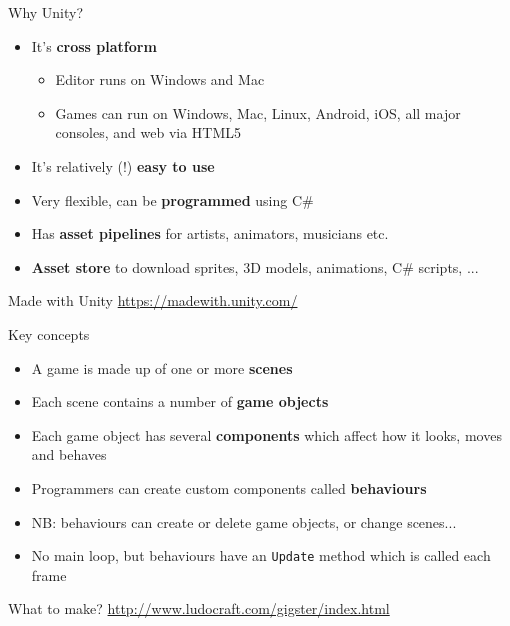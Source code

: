 \begin{frame}{Why Unity?}
	\begin{itemize}
		\pause\item It's \textbf{cross platform}
			\begin{itemize}
				\pause\item Editor runs on Windows and Mac
				\pause\item Games can run on Windows, Mac, Linux, Android, iOS, all major consoles, and web via HTML5
			\end{itemize}
		\pause\item It's relatively (!) \textbf{easy to use}
		\pause\item Very flexible, can be \textbf{programmed} using C\#
		\pause\item Has \textbf{asset pipelines} for artists, animators, musicians etc.
		\pause\item \textbf{Asset store} to download sprites, 3D models, animations, C\# scripts, ...
	\end{itemize}
\end{frame}

\begin{frame}{Made with Unity}
	\center\url{https://madewith.unity.com/}
\end{frame}

\begin{frame}{Key concepts}
	\begin{itemize}
		\pause\item A game is made up of one or more \textbf{scenes}
		\pause\item Each scene contains a number of \textbf{game objects}
		\pause\item Each game object has several \textbf{components} which affect how it looks, moves and behaves
		\pause\item Programmers can create custom components called \textbf{behaviours}
		\pause\item NB: behaviours can create or delete game objects, or change scenes...
		\pause\item No main loop, but behaviours have an \lstinline{Update} method which is called each frame
	\end{itemize}
\end{frame}

\begin{frame}{What to make?}
	\center\url{http://www.ludocraft.com/gigster/index.html}
\end{frame}


